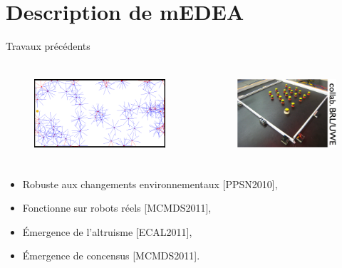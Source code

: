 \documentclass[8pt, handout=show,notes=show]{beamer}
\begin{document}
	\section{Description de mEDEA}
	
	
	\begin{frame}{Travaux précédents}
	\begin{columns}
	\begin{figure}%
	\includegraphics[width=\textwidth,height=3cm]{images/roborobo-setup-twosuns}
	\end{figure}
	\begin{figure}%
	\includegraphics[width=\textwidth,height=3cm]{images/medea-RealRobots}
	\end{figure}
	\end{columns}
	
	\vfill
	
	\begin{itemize}
	\item Robuste aux changements environnementaux {\small[PPSN2010]}, \nocite{bredeche11mcmds} 
	\vfil
	\item Fonctionne sur robots réels {\small[MCMDS2011]}, %
	\vfil
	\item \'{E}mergence de l'altruisme {\small[ECAL2011]},
	\vfil
	\item \'{E}mergence de concensus {\small[MCMDS2011]}.
	\end{itemize}
	
	
	\end{frame}
	
\end{document}
